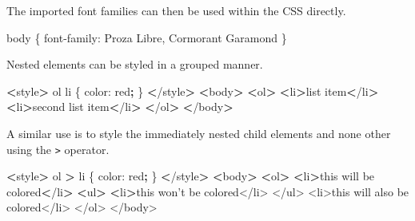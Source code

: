 \documentclass[]{book}
\newenvironment{Shaded}{\begin{snugshade}}{\end{snugshade}}
\newcommand{\ExtensionTok}[1]{#1}
\newcommand{\KeywordTok}[1]{\textcolor[rgb]{0.13,0.29,0.53}{\textbf{#1}}}
\newcommand{\NormalTok}[1]{#1}
\newcommand{\OperatorTok}[1]{\textcolor[rgb]{0.81,0.36,0.00}{\textbf{#1}}}
\newcommand{\StringTok}[1]{\textcolor[rgb]{0.31,0.60,0.02}{#1}}
\begin{document}
The imported font families can then be used within the CSS directly.

\begin{Shaded}
\begin{Highlighting}[]
\ExtensionTok{body}\NormalTok{ \{}
    \ExtensionTok{font-family}\NormalTok{: Proza Libre, Cormorant Garamond}
\NormalTok{\}}
\end{Highlighting}
\end{Shaded}

Nested elements can be styled in a grouped manner.

\begin{Shaded}
\begin{Highlighting}[]
\OperatorTok{<}\ExtensionTok{style}\OperatorTok{>}
    \ExtensionTok{ol}\NormalTok{ li \{}
        \ExtensionTok{color}\NormalTok{: red}\KeywordTok{;}
\NormalTok{    \}}
\OperatorTok{<}\NormalTok{/}\ExtensionTok{style}\OperatorTok{>}
\OperatorTok{<}\ExtensionTok{body}\OperatorTok{>}
    \OperatorTok{<}\ExtensionTok{ol}\OperatorTok{>}
        \OperatorTok{<}\ExtensionTok{li}\OperatorTok{>}\NormalTok{list item}\OperatorTok{<}\NormalTok{/li}\OperatorTok{>}
        \OperatorTok{<}\ExtensionTok{li}\OperatorTok{>}\NormalTok{second list item}\OperatorTok{<}\NormalTok{/li}\OperatorTok{>}
    \OperatorTok{<}\NormalTok{/}\ExtensionTok{ol}\OperatorTok{>}
\OperatorTok{<}\NormalTok{/}\ExtensionTok{body}\OperatorTok{>}
\end{Highlighting}
\end{Shaded}

A similar use is to style the immediately nested child elements and none other using the \texttt{\textgreater{}} operator.

\begin{Shaded}
\begin{Highlighting}[]
\OperatorTok{<}\ExtensionTok{style}\OperatorTok{>}
    \ExtensionTok{ol} \OperatorTok{>}\NormalTok{ li \{}
        \ExtensionTok{color}\NormalTok{: red}\KeywordTok{;}
\NormalTok{    \}}
\OperatorTok{<}\NormalTok{/}\ExtensionTok{style}\OperatorTok{>}
\OperatorTok{<}\ExtensionTok{body}\OperatorTok{>}
    \OperatorTok{<}\ExtensionTok{ol}\OperatorTok{>}
        \OperatorTok{<}\ExtensionTok{li}\OperatorTok{>}\NormalTok{this will be colored}\OperatorTok{<}\NormalTok{/li}\OperatorTok{>}
        \OperatorTok{<}\ExtensionTok{ul}\OperatorTok{>}
            \OperatorTok{<}\ExtensionTok{li}\OperatorTok{>}\NormalTok{this won}\StringTok{'t be colored</li>}
\StringTok{        </ul>}
\StringTok{        <li>this will also be colored</li>}
\StringTok{    </ol>}
\StringTok{</body>}
\end{Highlighting}
\end{Shaded}
\end{document}
